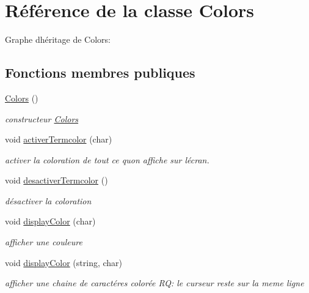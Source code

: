 \hypertarget{class_colors}{}\section{Référence de la classe Colors}
\label{class_colors}


Graphe d\textquotesingle{}héritage de Colors\+:
\subsection*{Fonctions membres publiques}
\begin{DoxyCompactItemize}
\item 
\hyperlink{class_colors_a65bde56fe97e9357aa8a901c0144eab5}{Colors} ()\hypertarget{class_colors_a65bde56fe97e9357aa8a901c0144eab5}{}\label{class_colors_a65bde56fe97e9357aa8a901c0144eab5}

\begin{DoxyCompactList}\small\item\em constructeur \hyperlink{class_colors}{Colors} \end{DoxyCompactList}\item 
void \hyperlink{class_colors_a22ceb07f137ca41c5772af5515337659}{activer\+Termcolor} (char)\hypertarget{class_colors_a22ceb07f137ca41c5772af5515337659}{}\label{class_colors_a22ceb07f137ca41c5772af5515337659}

\begin{DoxyCompactList}\small\item\em activer la coloration de tout ce qu\textquotesingle{}on affiche sur l\textquotesingle{}écran. \end{DoxyCompactList}\item 
void \hyperlink{class_colors_a7de6133476d73eaba1973184225c0641}{desactiver\+Termcolor} ()\hypertarget{class_colors_a7de6133476d73eaba1973184225c0641}{}\label{class_colors_a7de6133476d73eaba1973184225c0641}

\begin{DoxyCompactList}\small\item\em désactiver la coloration \end{DoxyCompactList}\item 
void \hyperlink{class_colors_ad28ab0599862a1abf71d49afa2386cdd}{display\+Color} (char)\hypertarget{class_colors_ad28ab0599862a1abf71d49afa2386cdd}{}\label{class_colors_ad28ab0599862a1abf71d49afa2386cdd}

\begin{DoxyCompactList}\small\item\em afficher une couleure \end{DoxyCompactList}\item 
void \hyperlink{class_colors_a8a346bc73359978fda0a1f07c436a6f2}{display\+Color} (string, char)\hypertarget{class_colors_a8a346bc73359978fda0a1f07c436a6f2}{}\label{class_colors_a8a346bc73359978fda0a1f07c436a6f2}

\begin{DoxyCompactList}\small\item\em afficher une chaine de caractéres colorée RQ\+: le curseur reste sur la meme ligne \end{DoxyCompactList}\end{DoxyCompactItemize}


